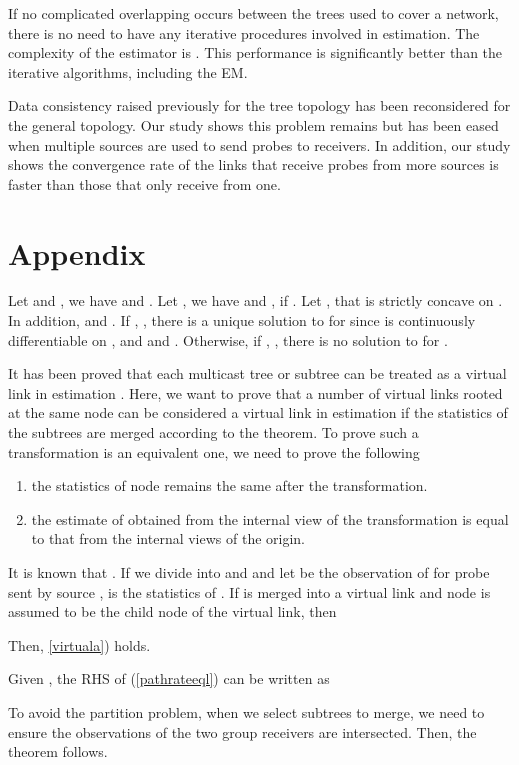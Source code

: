 \documentclass[10pt,twocolumn]{IEEEtran}
\begin{document}
If no complicated overlapping occurs between the trees used to cover a
network, there is no need to have any iterative procedures involved in
estimation. The complexity of the estimator is . This
performance is significantly better than the iterative algorithms,
including the EM.

Data consistency raised previously for the tree topology \cite{CDHT99}
has been reconsidered for the general topology. Our study shows this
problem remains but has been eased when multiple sources are used to
send probes to receivers. In addition, our study shows the convergence
rate of the links that receive probes from more sources is faster than
those that only receive from one.



\section*{Appendix}


\begin{IEEEproof} Let  and , we
have  and .
Let , we have 
and , if . Let , that is strictly concave on .
In addition, 
and . If , , there is
a unique solution to  for  since  is
continuously differentiable on , and 
and . Otherwise, if , , there is no
solution to  for .
 \end{IEEEproof}


\begin{IEEEproof}
It has been proved that each multicast tree or subtree can be treated
as a virtual link in estimation \cite{CDHT99}. Here, we want to prove
that a number of virtual links rooted at the same node can be
considered a virtual link in estimation if the statistics of the
subtrees are merged according to the theorem. To prove such a
transformation is an equivalent one, we need to prove the following
\begin{enumerate}
\item the statistics of node  remains the same after the
transformation. \label{virtuala}
\item the estimate of  obtained from the internal view of the transformation is equal to that from the internal views of the
origin. \label{virtualb}
\end{enumerate}

 It
is known that . If we divide  into  and  and let
 be
the observation of  for probe  sent by source ,  is the statistics of
. If  is merged into a virtual link
and node  is assumed to be the child node of the virtual link,
then


\noindent Then, \ref{virtuala}) holds.

Given , the RHS of (\ref{pathrateeql}) can
be written as




\noindent To avoid the partition problem, when we select subtrees to
merge, we need to ensure the observations of the two group receivers
are intersected. Then, the theorem follows.

\end{IEEEproof}






\end{document}
